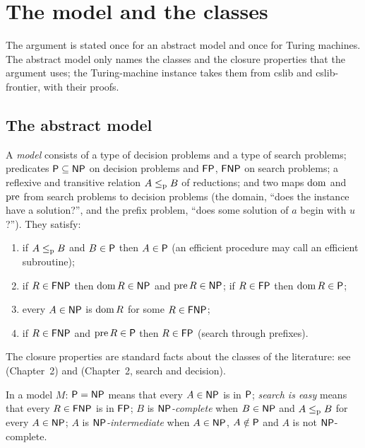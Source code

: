 \chapter{The model and the classes}
\label{chap:model}

The argument is stated once for an abstract model and once for Turing machines. The abstract
model only names the classes and the closure properties that the argument uses; the
Turing-machine instance takes them from cslib and cslib-frontier, with their proofs.

\section{The abstract model}

\begin{definition}
  \label{def:model}
  \leanok
  A \emph{model} consists of a type of decision problems and a type of search problems; predicates
  $\mathsf{P} \subseteq \mathsf{NP}$ on decision problems and $\mathsf{FP}$, $\mathsf{FNP}$ on search problems; a reflexive and
  transitive relation $A \le_{\mathrm{p}} B$ of reductions; and two maps $\operatorname{dom}$ and $\operatorname{pre}$ from search problems
  to decision problems (the domain, ``does the instance have a solution?'', and the prefix problem,
  ``does some solution of $a$ begin with $u$?''). They satisfy:
  \begin{enumerate}
    \item if $A \le_{\mathrm{p}} B$ and $B \in \mathsf{P}$ then $A \in \mathsf{P}$ (an efficient procedure may call an
      efficient subroutine);
    \item if $R \in \mathsf{FNP}$ then $\operatorname{dom} R \in \mathsf{NP}$ and $\operatorname{pre} R \in \mathsf{NP}$; if $R \in \mathsf{FP}$ then
      $\operatorname{dom} R \in \mathsf{P}$;
    \item every $A \in \mathsf{NP}$ is $\operatorname{dom} R$ for some $R \in \mathsf{FNP}$;
    \item if $R \in \mathsf{FNP}$ and $\operatorname{pre} R \in \mathsf{P}$ then $R \in \mathsf{FP}$ (search through prefixes).
  \end{enumerate}
  \own{} The closure properties are standard facts about the classes of the literature: see
  \cite{AroraBarak} (Chapter~2) and \cite{Goldreich} (Chapter~2, search and decision).
\end{definition}

\begin{definition}[$\cP = \cNP$, easy search, completeness, intermediate problems]
  \label{def:model-classes}
  \leanok
  In a model $M$:
  $\cP = \cNP$ means that every $A \in \mathsf{NP}$ is in $\mathsf{P}$;
  \emph{search is easy} means that every $R \in \mathsf{FNP}$ is in $\mathsf{FP}$;
  $B$ is \emph{$\mathsf{NP}$-complete} when $B \in \mathsf{NP}$ and $A \le_{\mathrm{p}} B$ for every $A \in \mathsf{NP}$;
  $A$ is \emph{$\mathsf{NP}$-intermediate} when $A \in \mathsf{NP}$, $A \notin \mathsf{P}$ and $A$ is not
  $\mathsf{NP}$-complete.
  \own{}
\end{definition}

